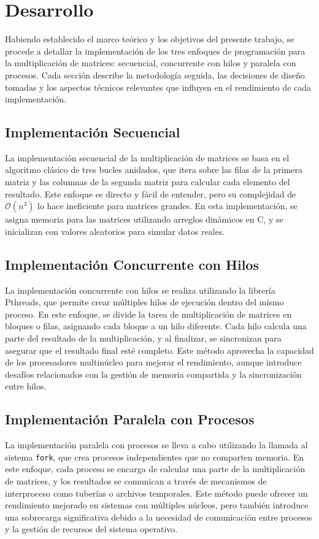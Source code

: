 
\section{Desarrollo}
\label{sec:Desarrollo}


Habiendo establecido el marco teórico y los objetivos del presente trabajo, se procede a detallar la implementación de los tres enfoques de programación para la multiplicación de matrices: secuencial, concurrente con hilos y paralela con procesos. Cada sección describe la metodología seguida, las decisiones de diseño tomadas y los aspectos técnicos relevantes que influyen en el rendimiento de cada implementación.

\subsection{Implementación Secuencial}
La implementación secuencial de la multiplicación de matrices se basa en el algoritmo clásico de tres bucles anidados, que itera sobre las filas de la primera matriz y las columnas de la segunda matriz para calcular cada elemento del resultado. Este enfoque es directo y fácil de entender, pero su complejidad de \(\mathcal{O}(n^3)\) lo hace ineficiente para matrices grandes. En esta implementación, se asigna memoria para las matrices utilizando arreglos dinámicos en C, y se inicializan con valores aleatorios para simular datos reales.

\subsection{Implementación Concurrente con Hilos}
La implementación concurrente con hilos se realiza utilizando la librería Pthreads, que permite crear múltiples hilos de ejecución dentro del mismo proceso. En este enfoque, se divide la tarea de multiplicación de matrices en bloques o filas, asignando cada bloque a un hilo diferente. Cada hilo calcula una parte del resultado de la multiplicación, y al finalizar, se sincronizan para asegurar que el resultado final esté completo. Este método aprovecha la capacidad de los procesadores multinúcleo para mejorar el rendimiento, aunque introduce desafíos relacionados con la gestión de memoria compartida y la sincronización entre hilos. 

\subsection{Implementación Paralela con Procesos}
La implementación paralela con procesos se lleva a cabo utilizando la llamada al sistema \texttt{fork}, que crea procesos independientes que no comparten memoria. En este enfoque, cada proceso se encarga de calcular una parte de la multiplicación de matrices, y los resultados se comunican a través de mecanismos de interproceso como tuberías o archivos temporales. Este método puede ofrecer un rendimiento mejorado en sistemas con múltiples núcleos, pero también introduce una sobrecarga significativa debido a la necesidad de comunicación entre procesos y la gestión de recursos del sistema operativo.


